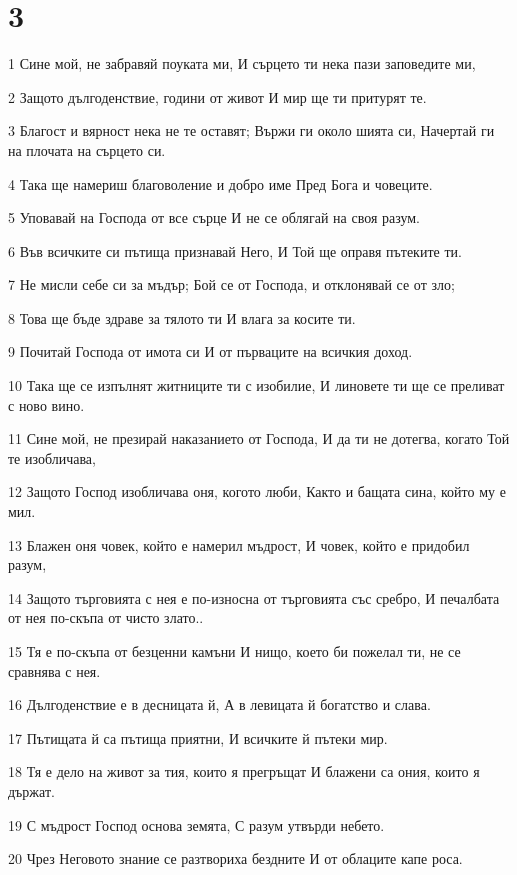 \chapter{3}

\par 1 Сине мой, не забравяй поуката ми, И сърцето ти нека пази заповедите ми,
\par 2 Защото дългоденствие, години от живот И мир ще ти притурят те.
\par 3 Благост и вярност нека не те оставят; Вържи ги около шията си, Начертай ги на плочата на сърцето си.
\par 4 Така ще намериш благоволение и добро име Пред Бога и човеците.
\par 5 Уповавай на Господа от все сърце И не се облягай на своя разум.
\par 6 Във всичките си пътища признавай Него, И Той ще оправя пътеките ти.
\par 7 Не мисли себе си за мъдър; Бой се от Господа, и отклонявай се от зло;
\par 8 Това ще бъде здраве за тялото ти И влага за косите ти.
\par 9 Почитай Господа от имота си И от първаците на всичкия доход.
\par 10 Така ще се изпълнят житниците ти с изобилие, И линовете ти ще се преливат с ново вино.
\par 11 Сине мой, не презирай наказанието от Господа, И да ти не дотегва, когато Той те изобличава,
\par 12 Защото Господ изобличава оня, когото люби, Както и бащата сина, който му е мил.
\par 13 Блажен оня човек, който е намерил мъдрост, И човек, който е придобил разум,
\par 14 Защото търговията с нея е по-износна от търговията със сребро, И печалбата от нея по-скъпа от чисто злато..
\par 15 Тя е по-скъпа от безценни камъни И нищо, което би пожелал ти, не се сравнява с нея.
\par 16 Дългоденствие е в десницата й, А в левицата й богатство и слава.
\par 17 Пътищата й са пътища приятни, И всичките й пътеки мир.
\par 18 Тя е дело на живот за тия, които я прегръщат И блажени са ония, които я държат.
\par 19 С мъдрост Господ основа земята, С разум утвърди небето.
\par 20 Чрез Неговото знание се разтвориха бездните И от облаците капе роса.
